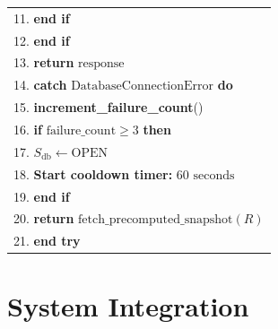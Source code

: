 \documentclass[12pt,a4paper]{report}
\theoremstyle{definition}
\theoremstyle{remark}
\begin{document}
\begin{table}[htbp]
\begin{tabular}{p{15cm}}
11. \quad\quad \textbf{end if} \\

12. \quad \textbf{end if} \\

13. \quad \textbf{return} $\text{response}$ \\

14. \textbf{catch} $\text{DatabaseConnectionError}$ \textbf{do} \\

15. \quad \textbf{increment\_failure\_count}() \\

16. \quad \textbf{if} $\text{failure\_count} \geq 3$ \textbf{then} \\

17. \quad\quad $S_{\text{db}} \leftarrow \text{OPEN}$ \\

18. \quad\quad \textbf{Start cooldown timer:} $60\text{ seconds}$ \\

19. \quad \textbf{end if} \\

20. \quad \textbf{return} $\text{fetch\_precomputed\_snapshot}(R)$ \\

21. \textbf{end try} \\

\bottomrule
\end{tabular}
\end{table}
\section{System Integration}
\end{document}
